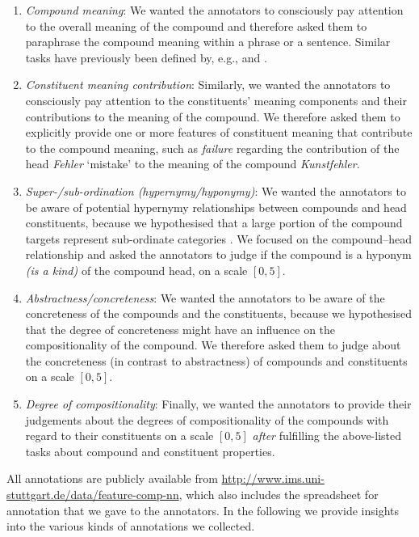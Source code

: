 \documentclass[output=paper,colorlinks,citecolor=brown]{langscibook}
\begin{document}
\begin{enumerate}
\item \textit{Compound meaning}:
    We wanted the annotators to consciously pay attention to the overall meaning of the compound and therefore asked them to paraphrase the compound meaning within a phrase or a sentence. Similar tasks have previously been defined by, e.g., \citet{Wisniewski:96} and \citet{Marsh:15}.

\item \textit{Constituent meaning contribution}:
    Similarly, we wanted the annotators to consciously pay attention to the constituents' meaning components and their contributions to the meaning of the compound. We therefore asked them to explicitly provide one or more features of constituent meaning that contribute to the compound meaning, such as \textit{failure} regarding the contribution of the head \textit{Fehler} `mistake' to the meaning of the compound \textit{Kunstfehler}.

\item \textit{Super-/sub-ordination (hypernymy/hyponymy)}:
    We wanted the annotators to be aware of potential hypernymy relationships between compounds and head constituents, because we hypothesised that a large portion of the compound targets represent sub-ordinate categories \citep{GagneEtAl:19, GagneEtAl:20}. We focused on the compound--head relationship and asked the annotators to judge if the compound is a hyponym \textit{(is a kind)} of the compound head, on a scale $[0,5]$.
    
\item \textit{Abstractness/concreteness}:
    We wanted the annotators to be aware of the concreteness of the compounds and the constituents, because we hypothesised that the degree of concreteness might have an influence on the compositionality of the compound. We therefore asked them to judge about the concreteness (in contrast to abstractness) of compounds and constituents on a scale $[0,5]$.
    
\item \textit{Degree of compositionality}:
    Finally, we wanted the annotators to provide their judgements about the degrees of compositionality of the compounds with regard to their constituents on a scale $[0,5]$ \textit{after} fulfilling the above-listed tasks about compound and constituent properties.
\end{enumerate}

\begin{sloppypar}
\noindent All annotations are publicly available from \url{http://www.ims.uni-stuttgart.de/data/feature-comp-nn}, which also includes the spreadsheet for annotation that we gave to the annotators. In the following we provide insights into the various kinds of annotations we collected.
\end{sloppypar}
\end{document}
